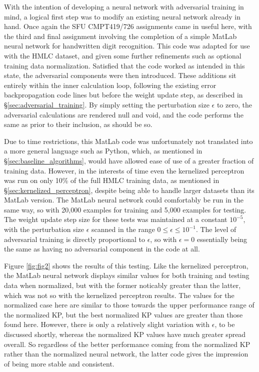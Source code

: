 \documentclass{article} %
\begin{document}
With the intention of developing a neural network with adversarial training in mind, a logical first step was to modify an existing neural network already in hand. Once again the SFU CMPT419/726 assignments came in useful here, with the third and final assignment involving the completion of a simple MatLab neural network for handwritten digit recognition. This code was adapted for use with the HMLC dataset, and given some further refinements such as optional training data normalization. Satisfied that the code worked as intended in this state, the adversarial components were then introduced. These additions sit entirely within the inner calculation loop, following the existing error backpropagation code lines but before the weight update step, as described in \S\ref{sec:adversarial_training}. By simply setting the perturbation size $\epsilon$ to zero, the adversarial calculations are rendered null and void, and the code performs the same as prior to their inclusion, as should be so.

Due to time restrictions, this MatLab code was unfortunately not translated into a more general language such as Python, which, as mentioned in \S\ref{sec:baseline_algorithms}, would have allowed ease of use of a greater fraction of training data. However, in the interests of time even the kernelized perceptron was run on only 10\% of the full HMLC training data, as mentioned in \S\ref{sec:kernelized_perceptron}, despite being able to handle larger datasets than its MatLab version. The MatLab neural network could comfortably be run in the same way, so with 20,000 examples for training and 5,000 examples for testing. The weight update step size for these tests was maintained at a constant $10^{-5}$, with the perturbation size $\epsilon$ scanned in the range $0\le\epsilon\le10^{-1}$. The level of adversarial training is directly proportional to $\epsilon$, so with $\epsilon=0$ essentially being the same as having no adversarial component in the code at all.

Figure \ref{fig:fig2} shows the results of this testing. Like the kernelized perceptron, the MatLab neural network displays similar values for both training and testing data when normalized, but with the former noticably greater than the latter, which was not so with the kernelized perceptron results. The values for the normalized case here are similar to those towards the upper performance range of the normalized KP, but the best normalized KP values are greater than those found here. However, there is only a relatively slight variation with $\epsilon$, to be discussed shortly, whereas the normalized KP values have much greater spread overall. So regardless of the better performance coming from the normalized KP rather than the normalized neural network, the latter code gives the impression of being more stable and consistent.
\end{document}
